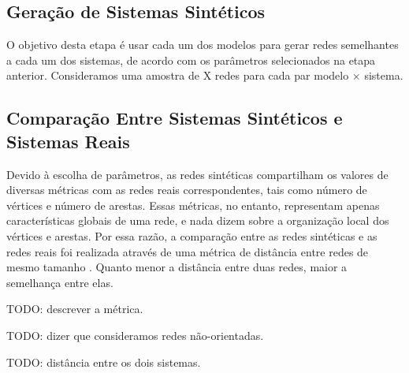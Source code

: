 \documentclass{acm_proc_article-sp}
\begin{document}
\subsection{Geração de Sistemas Sintéticos}

O objetivo desta etapa é usar cada um dos modelos para gerar redes semelhantes a cada um dos sistemas, de acordo com os parâmetros selecionados na etapa anterior. Consideramos uma amostra de X redes para cada par modelo $\times$ sistema.


\subsection{Comparação Entre Sistemas Sintéticos e Sistemas Reais}

Devido à escolha de parâmetros, as redes sintéticas compartilham os valores de diversas métricas com as redes reais correspondentes, tais como número de vértices e número de arestas. Essas métricas, no entanto, representam apenas características globais de uma rede, e nada dizem sobre a organização local dos vértices e arestas. Por essa razão, a comparação entre as redes sintéticas e as redes reais foi realizada através de uma métrica de distância entre redes de mesmo tamanho \cite{Andrade2008}. Quanto menor a distância entre duas redes, maior a semelhança entre elas.

TODO: descrever a métrica.

TODO: dizer que consideramos redes não-orientadas.

TODO: distância entre os dois sistemas.




\end{document}
